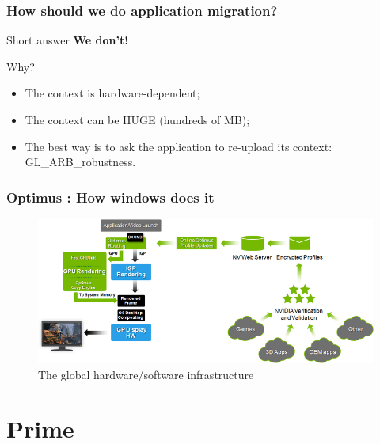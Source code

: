 \documentclass[11pt,english,compress]{beamer}
\begin{document}
\begin{frame}
	\frametitle{How should we do application migration?}

	\begin{block}{Short answer}
		\textbf{We don't!}
	\end{block}

	\begin{block}{Why?}
		\begin{itemize}
			\item The context is hardware-dependent;
			\item The context can be HUGE (hundreds of MB);
			\item The best way is to ask the application to re-upload its context: GL\_ARB\_robustness.
		\end{itemize}
	\end{block}
\end{frame}

\begin{frame}
	\frametitle{Optimus : How windows does it}

	\begin{figure}[h]
		\centering
		\includegraphics[width=1\linewidth]{imgs/optimus_arch.png}
		\caption{The global hardware/software infrastructure}
	\end{figure}
\end{frame}

\section{Prime}
\end{document}

